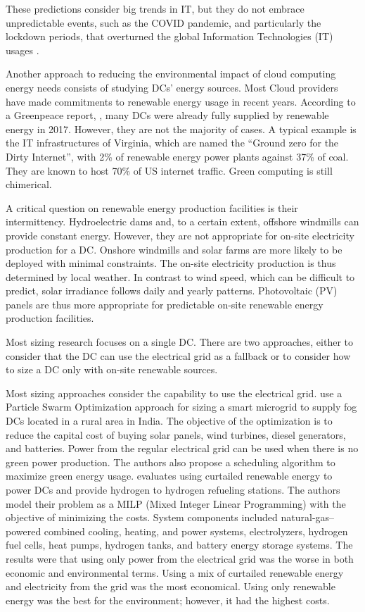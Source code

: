 These predictions consider big trends in IT, but they do not embrace
unpredictable events, such as the COVID pandemic, and particularly the
lockdown periods, that overturned the global Information Technologies
(IT) usages \cite{feldmann2021implications}.


Another approach to reducing the environmental impact of cloud
computing energy needs consists of studying DCs' energy sources. Most
Cloud providers have made commitments to renewable energy usage in
recent years. According to a Greenpeace report, \cite{greenpeace2017},
many DCs were already fully supplied by renewable energy in
2017. However, they are not the majority of cases. A typical example
is the IT infrastructures of Virginia, which are named the ``Ground
zero for the Dirty Internet'', with 2\% of renewable energy power
plants against 37\% of coal. They are known to host 70\% of US
internet traffic. Green computing is still chimerical.


A critical question on renewable energy production facilities is their
intermittency. Hydroelectric dams and, to a certain extent, offshore
windmills can provide constant energy. However, they are not
appropriate for on-site electricity production for a DC. Onshore
windmills and solar farms are more likely to be deployed with minimal
constraints. The on-site electricity production is thus determined by
local weather. In contrast to wind speed, which can be difficult to
predict, solar irradiance follows daily and yearly
patterns. Photovoltaic (PV) panels are thus more appropriate for
predictable on-site renewable energy production facilities.


Most sizing research focuses on a single DC. There are two approaches, either to consider that the DC can use the electrical grid as a fallback or to consider how to size a DC only with on-site renewable sources.

Most sizing approaches consider the capability to use the electrical grid. %
\cite{padma2021_fogdcs_rural} use a Particle Swarm Optimization approach for sizing a smart microgrid to supply fog DCs located in a rural area in India. The objective of the optimization is to reduce the capital cost of buying solar panels, wind turbines, diesel generators, and batteries. Power from the regular electrical grid can be used when there is no green power production. The authors also propose a scheduling algorithm to maximize green energy usage.
%
\citet{Niaz2022_curtailment} evaluates using curtailed renewable energy to power DCs and provide hydrogen to hydrogen refueling stations. The authors model their problem as a MILP (Mixed Integer Linear Programming) with the objective of minimizing the costs. System components included natural-gas–powered combined cooling, heating, and power systems, electrolyzers, hydrogen fuel cells, heat pumps, hydrogen tanks, and battery energy storage systems. The results were that using only power from the electrical grid was the worse in both economic and environmental terms. Using a mix of curtailed renewable energy and electricity from the grid was the most economical. Using only renewable energy was the best for the environment; however, it had the highest costs.

